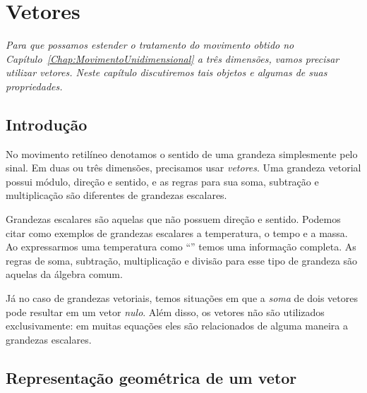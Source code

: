 \chapter{Vetores}
\label{Chap:Vetores}


\begin{fullwidth}
{\it
Para que possamos estender o tratamento do movimento obtido no Capítulo~\ref{Chap:MovimentoUnidimensional} a três dimensões, vamos precisar utilizar vetores. Neste capítulo discutiremos tais objetos e algumas de suas propriedades.
}
\end{fullwidth}

\section{Introdução}

No movimento retilíneo denotamos o sentido de uma grandeza simplesmente pelo sinal. Em duas ou três dimensões, precisamos usar \emph{vetores}. Uma grandeza vetorial possui módulo, direção e sentido, e as regras para sua soma, subtração e multiplicação são diferentes de grandezas escalares.

Grandezas escalares são aquelas que não possuem direção e sentido. Podemos citar como exemplos de grandezas escalares a temperatura, o tempo e a massa. Ao expressarmos uma temperatura como ``'' temos uma informação completa. As regras de soma, subtração, multiplicação e divisão para esse tipo de grandeza são aquelas da álgebra comum.

Já no caso de grandezas vetoriais, temos situações em que a \emph{soma} de dois vetores pode resultar em um vetor \emph{nulo}. Além disso, os vetores não são utilizados exclusivamente: em muitas equações eles são relacionados de alguma maneira a grandezas escalares.


\section{Representação geométrica de um vetor}

